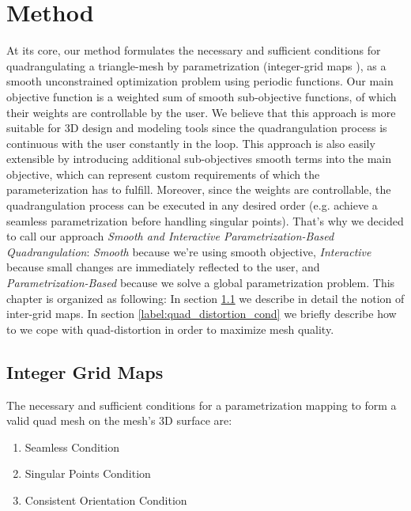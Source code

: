 \chapter{Method}
At its core, our method formulates the necessary and sufficient conditions for quadrangulating a triangle-mesh by parametrization (integer-grid maps \cite{bommes:hal-00862648}), as a smooth unconstrained optimization problem using periodic functions. Our main objective function is a weighted sum of smooth sub-objective functions, of which their weights are controllable by the user. We believe that this approach is more suitable for 3D design and modeling tools since the quadrangulation process is continuous with the user constantly in the loop. This approach is also easily extensible by introducing additional sub-objectives smooth terms into the main objective, which can represent custom requirements of which the parameterization has to fulfill. Moreover, since the weights are controllable, the quadrangulation process can be executed in any desired order (e.g. achieve a seamless parametrization before handling singular points). That's why we decided  to call our approach \emph{Smooth and Interactive Parametrization-Based Quadrangulation}: \emph{Smooth} because we're using smooth objective, \emph{Interactive} because small changes are immediately reflected to the user, and \emph{Parametrization-Based} because we solve a global parametrization problem. This chapter is organized as following: In section \ref{integer-grid-maps} we describe in detail the notion of inter-grid maps. In section \ref{label:quad_distortion_cond} we briefly describe how to we cope with quad-distortion in order to maximize mesh quality.

\section{Integer Grid Maps}
\label{integer-grid-maps}
The necessary and sufficient conditions for a parametrization mapping to form a valid quad mesh on the mesh's 3D surface are:
\begin{enumerate}
\item Seamless Condition
\item Singular Points Condition
\item Consistent Orientation Condition
\end{enumerate}

